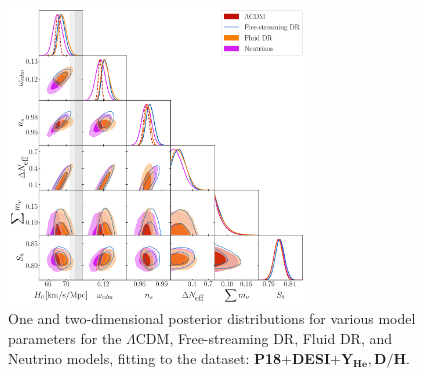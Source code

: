 \documentclass[aps,prd,twocolumn,notitlepage,
superscriptaddress,
nofootinbib,floatfix]{revtex4-2}
\newcommand{\planck}{\textbf{P18}}
\newcommand{\desi}{$\mathbf{+}$\textbf{DESI}}
\newcommand{\bbnlike}{$\mathbf{+ Y_\text{He}, D/H}$}
\begin{document}
\begin{widetext}
\begin{figure}[H]
\centering
    \includegraphics[width=0.7\textwidth]{figures_21_4/all_DB.pdf}
    \caption{One and two-dimensional posterior distributions for various model parameters for the $\Lambda$CDM, Free-streaming DR, Fluid DR, and Neutrino models, fitting to the dataset: \planck\desi\bbnlike.}
\end{figure}


\end{widetext}
\end{document}
